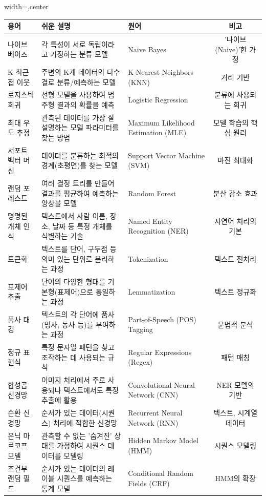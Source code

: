 \documentclass[11pt,a4paper]{article}
\begin{document}
\begin{adjustbox}{width=\textwidth,center}
\begin{tabular}{lllc}
\toprule
\textbf{용어} & \textbf{쉬운 설명} & \textbf{원어} & \textbf{비고} \\
\midrule
나이브 베이즈 & 각 특성이 서로 독립이라고 가정하는 분류 모델 & Naive Bayes & '나이브(Naive)'한 가정 \\
K-최근접 이웃 & 주변의 K개 데이터의 다수결로 분류/예측하는 모델 & K-Nearest Neighbors (KNN) & 거리 기반 \\
로지스틱 회귀 & 선형 모델을 사용하여 범주형 결과의 확률을 예측 & Logistic Regression & 분류에 사용되는 회귀 \\
최대 우도 추정 & 관측된 데이터를 가장 잘 설명하는 모델 파라미터를 찾는 방법 & Maximum Likelihood Estimation (MLE) & 모델 학습의 핵심 원리 \\
서포트 벡터 머신 & 데이터를 분류하는 최적의 경계(초평면)를 찾는 모델 & Support Vector Machine (SVM) & 마진 최대화 \\
랜덤 포레스트 & 여러 결정 트리를 만들어 결과를 평균하여 예측하는 앙상블 모델 & Random Forest & 분산 감소 효과 \\
명명된 개체 인식 & 텍스트에서 사람 이름, 장소, 날짜 등 특정 개체를 식별하는 기술 & Named Entity Recognition (NER) & 자연어 처리의 기본 \\
토큰화 & 텍스트를 단어, 구두점 등 의미 있는 단위로 분리하는 과정 & Tokenization & 텍스트 전처리 \\
표제어 추출 & 단어의 다양한 형태를 기본형(표제어)으로 통일하는 과정 & Lemmatization & 텍스트 정규화 \\
품사 태깅 & 텍스트의 각 단어에 품사(명사, 동사 등)를 부여하는 과정 & Part-of-Speech (POS) Tagging & 문법적 분석 \\
정규 표현식 & 특정 문자열 패턴을 찾고 조작하는 데 사용되는 규칙 & Regular Expressions (Regex) & 패턴 매칭 \\
합성곱 신경망 & 이미지 처리에서 주로 사용되나 텍스트에서도 특징 추출에 활용 & Convolutional Neural Network (CNN) & NER 모델의 기반 \\
순환 신경망 & 순서가 있는 데이터(시퀀스) 처리에 적합한 신경망 & Recurrent Neural Network (RNN) & 텍스트, 시계열 데이터 \\
은닉 마르코프 모델 & 관측할 수 없는 '숨겨진' 상태를 가정하여 시퀀스 데이터를 모델링 & Hidden Markov Model (HMM) & 시퀀스 모델링 \\
조건부 랜덤 필드 & 순서가 있는 데이터의 레이블 시퀀스를 예측하는 통계 모델 & Conditional Random Fields (CRF) & HMM의 확장 \\

\end{tabular}
\end{adjustbox}
\end{document}
